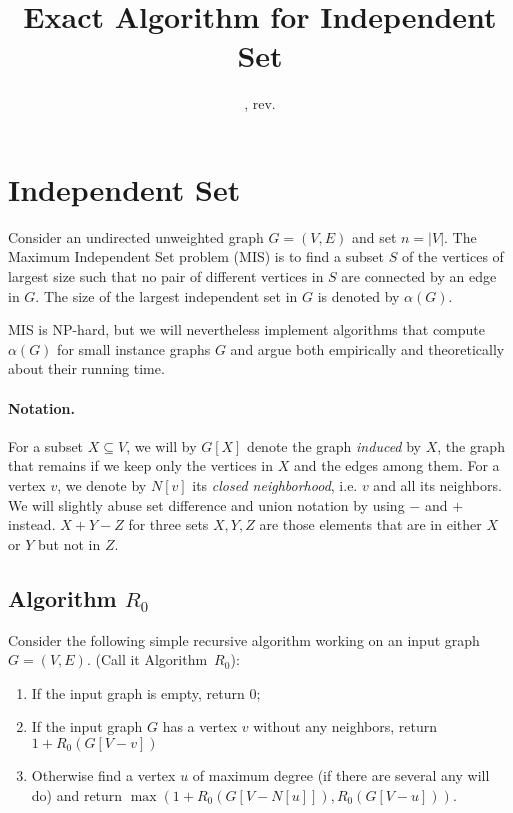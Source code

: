 \documentclass{tufte-handout}
\title{\sf Exact Algorithm for Independent Set}
\date{\GITAuthorDate, rev. \GITAbrHash}
\author{}
\begin{document}
\maketitle

\section{Independent Set}
Consider an undirected unweighted graph $G=(V,E)$ and set $n=|V|$.
The Maximum Independent Set problem (MIS) is to find a subset $S$ of
the vertices of largest size such that no pair of different vertices
in $S$ are connected by an edge in $G$.
The size of the largest independent set in $G$ is denoted by
$\alpha(G)$.

MIS is NP-hard, but we will nevertheless implement algorithms that
compute $\alpha(G)$ for small instance graphs $G$ and argue both
empirically and theoretically about their running time.

\paragraph{Notation.}
For a subset $X\subseteq V$, we will by $G[X]$ denote the graph
\emph{induced} by $X$, the graph that remains if we keep only the
vertices in $X$ and the edges among them.
For a vertex $v$, we denote by $N[v]$ its \emph{closed neighborhood},
i.e. $v$ and all its neighbors.
We will slightly abuse set difference and union notation by using $-$
and $+$ instead.
$X+Y-Z$ for three sets $X,Y,Z$ are those elements that are in either
$X$ or $Y$ but not in $Z$.


\subsection{Algorithm $R_0$}

Consider the following simple recursive algorithm working on an input
graph $G=(V,E)$.
(Call it Algorithm~$R_0$):
\begin{enumerate}
\item
If the input graph is empty, return $0$;
\item
If the input graph $G$ has a vertex $v$ without any neighbors, return $1+R_0(G[V-v])$
\item Otherwise find a vertex $u$ of maximum degree (if there are
  several any will do) and return $\max(1+R_0(G[V-N[u]]),
  R_0(G[V-u]))$.
\end{enumerate}
\end{document}
